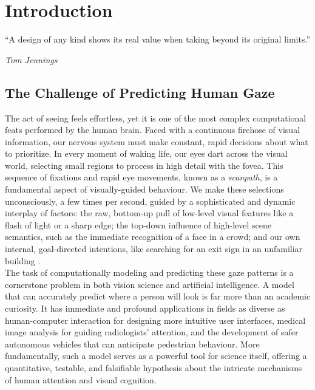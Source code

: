 \chapter{Introduction}
\label{c:intro}

%
%
\epigraph{\enquote{A design of any kind shows its real value when taking beyond its original limits.}}{\emph{Tom Jennings}}

\section{The Challenge of Predicting Human Gaze}
\label{sec:intro_challenge}

The act of seeing feels effortless, yet it is one of the most complex computational feats performed by the human brain. Faced with a continuous firehose of visual information, our nervous system must make constant, rapid decisions about what to prioritize. In every moment of waking life, our eyes dart across the visual world, selecting small regions to process in high detail with the fovea. This sequence of fixations and rapid eye movements, known as a \textit{scanpath}, is a fundamental aspect of visually-guided behaviour. We make these selections unconsciously, a few times per second, guided by a sophisticated and dynamic interplay of factors: the raw, bottom-up pull of low-level visual features like a flash of light or a sharp edge; the top-down influence of high-level scene semantics, such as the immediate recognition of a face in a crowd; and our own internal, goal-directed intentions, like searching for an exit sign in an unfamiliar building \cite{kummerer2023predicting}.\\
The task of computationally modeling and predicting these gaze patterns is a cornerstone problem in both vision science and artificial intelligence. A model that can accurately predict where a person will look is far more than an academic curiosity. It has immediate and profound applications in fields as diverse as human-computer interaction for designing more intuitive user interfaces, medical image analysis for guiding radiologists' attention, and the development of safer autonomous vehicles that can anticipate pedestrian behaviour. More fundamentally, such a model serves as a powerful tool for science itself, offering a quantitative, testable, and falsifiable hypothesis about the intricate mechanisms of human attention and visual cognition.

